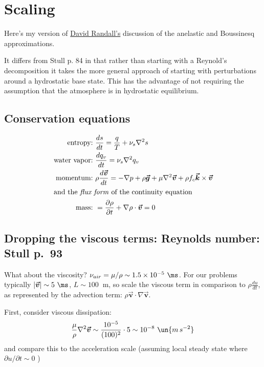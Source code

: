 \documentclass[12pt]{article}
\begin{document}
\newcommand{\vect}[1]{\boldsymbol{\vec{#1}}}
\pagestyle{first}


\section{Scaling}
\label{sec:thermodynamics}


Here's my version of  
\href{https://hogback.atmos.colostate.edu/group/dave/QuickStudies.html}{David Randall's}
discussion of the anelastic and Boussinesq approximations.  

It differs from Stull p. 84 in that rather than starting with a Reynold's decomposition it takes
the more general approach of starting with perturbations around a hydrostatic
base state.  This has the advantage of not requiring the assumption that the
atmosphere is in hydrostatic equilibrium.


\subsection{Conservation equations}
\label{sec:cons-equat}


\begin{align}
  \text{entropy:\ }& \frac{ ds}{dt}=\frac{ q}{T} + \nu_s \nabla^2 s\\
  \text{water vapor:\ }& \frac{ dq_v}{dt}= \nu_s \nabla^2 q_v \\
  \text{momentum:\ }& \rho \frac{ d \vect{v}}{dt}= -\nabla p + \rho \vect{g} + 
             \mu \nabla^2 \vect{v} + \rho f_c \vect{k} \times \vect{v} \\
 \intertext{and the \textit{flux form} of the continuity equation}
\text{mass:\ }&= \frac{\partial \rho }{\partial t} + \nabla \rho \cdot \vect{v} = 0
\end{align}

\subsection{Dropping the viscous terms: Reynolds number: Stull p.~93}
\label{sec:stull93}

What about the viscosity?  $\nu_{air}=\mu/\rho \sim 1.5 \times 10^{-5}\ \ms$.  
For our problems typically $| \vect{v} | \sim 5\ \ms$, $L \sim 100\ $ m, 
so scale the viscous term in comparison to $\rho \frac{ du}{dt}$, as
represented by the advection term: $\rho \vect{v} \cdot \nabla \vect{v}$. 


First, consider viscous dissipation:
\begin{gather}
  \frac{\mu }{\rho} \nabla^2 \vect{v} \sim \frac{10^{-5} }{(100)^2} \cdot 5 \sim 10^{-8}\ \un{m\,s^{-2}}
\end{gather}
and compare this to the acceleration scale (assuming local steady state where $ \partial u/\partial t \sim 0$ )
\end{document}
